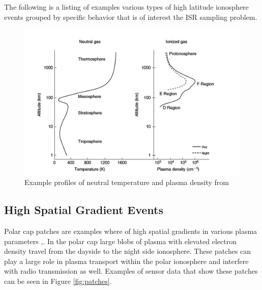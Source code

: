 The following is a listing of examples various types of high latitude ionosphere events grouped by specific behavior that is of interest the ISR sampling problem.

\begin{figure}[!t]
\centering
\includegraphics[width=5in]{altvsparams}
\caption{Example profiles of neutral temperature and plasma density from \cite{kellybook}}
\label{fig:singlefilt}
\end{figure}

\subsection*{High Spatial Gradient Events}
Polar cap patches are examples where of high spatial gradients in various plasma parameters \cite{Dahlgren:2012dq},\cite{dahlgren2012di}.  In the polar cap large blobs of plasma with elevated electron density travel from the dayside to the night side ionosphere.  These patches can play a large role in plasma transport within the polar ionosphere and interfere with radio transmission as well.  Examples of sensor data that show these patches can be seen in Figure \ref{fig:patches}.

